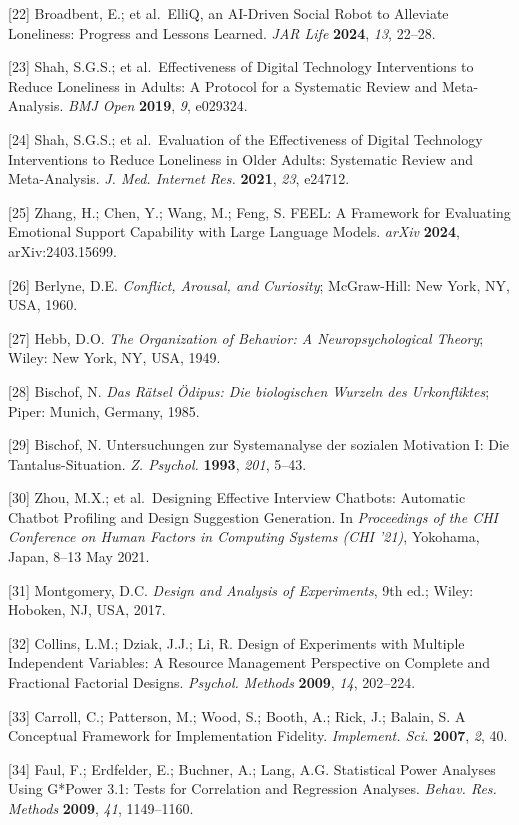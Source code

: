 {[}22{]} Broadbent, E.; et al.~ElliQ, an AI-Driven Social Robot to Alleviate Loneliness: Progress and Lessons Learned. \emph{JAR Life} \textbf{2024}, \emph{13}, 22--28.

{[}23{]} Shah, S.G.S.; et al.~Effectiveness of Digital Technology Interventions to Reduce Loneliness in Adults: A Protocol for a Systematic Review and Meta-Analysis. \emph{BMJ Open} \textbf{2019}, \emph{9}, e029324.

{[}24{]} Shah, S.G.S.; et al.~Evaluation of the Effectiveness of Digital Technology Interventions to Reduce Loneliness in Older Adults: Systematic Review and Meta-Analysis. \emph{J. Med. Internet Res.} \textbf{2021}, \emph{23}, e24712.

{[}25{]} Zhang, H.; Chen, Y.; Wang, M.; Feng, S. FEEL: A Framework for Evaluating Emotional Support Capability with Large Language Models. \emph{arXiv} \textbf{2024}, arXiv:2403.15699.

{[}26{]} Berlyne, D.E. \emph{Conflict, Arousal, and Curiosity}; McGraw-Hill: New York, NY, USA, 1960.

{[}27{]} Hebb, D.O. \emph{The Organization of Behavior: A Neuropsychological Theory}; Wiley: New York, NY, USA, 1949.

{[}28{]} Bischof, N. \emph{Das Rätsel Ödipus: Die biologischen Wurzeln des Urkonfliktes}; Piper: Munich, Germany, 1985.

{[}29{]} Bischof, N. Untersuchungen zur Systemanalyse der sozialen Motivation I: Die Tantalus-Situation. \emph{Z. Psychol.} \textbf{1993}, \emph{201}, 5--43.

{[}30{]} Zhou, M.X.; et al.~Designing Effective Interview Chatbots: Automatic Chatbot Profiling and Design Suggestion Generation. In \emph{Proceedings of the CHI Conference on Human Factors in Computing Systems (CHI '21)}, Yokohama, Japan, 8--13 May 2021.

{[}31{]} Montgomery, D.C. \emph{Design and Analysis of Experiments}, 9th ed.; Wiley: Hoboken, NJ, USA, 2017.

{[}32{]} Collins, L.M.; Dziak, J.J.; Li, R. Design of Experiments with Multiple Independent Variables: A Resource Management Perspective on Complete and Fractional Factorial Designs. \emph{Psychol. Methods} \textbf{2009}, \emph{14}, 202--224.

{[}33{]} Carroll, C.; Patterson, M.; Wood, S.; Booth, A.; Rick, J.; Balain, S. A Conceptual Framework for Implementation Fidelity. \emph{Implement. Sci.} \textbf{2007}, \emph{2}, 40.

{[}34{]} Faul, F.; Erdfelder, E.; Buchner, A.; Lang, A.G. Statistical Power Analyses Using G*Power 3.1: Tests for Correlation and Regression Analyses. \emph{Behav. Res. Methods} \textbf{2009}, \emph{41}, 1149--1160.

